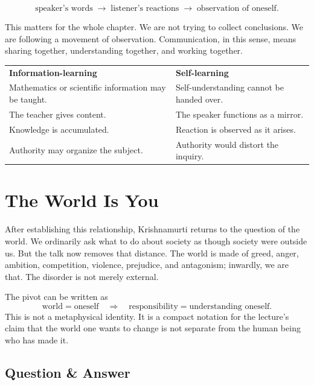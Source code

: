 \begin{equation}
\text{speaker's words}
\;\longrightarrow\;
\text{listener's reactions}
\;\longrightarrow\;
\text{observation of oneself}.
\end{equation}

This matters for the whole chapter. We are not trying to collect conclusions. We are following a movement of observation. Communication, in this sense, means sharing together, understanding together, and working together.

\begin{table}
\centering
\begin{tabular}{p{.42\linewidth}p{.42\linewidth}}
\textbf{Information-learning} & \textbf{Self-learning} \\
Mathematics or scientific information may be taught. & Self-understanding cannot be handed over. \\
The teacher gives content. & The speaker functions as a mirror. \\
Knowledge is accumulated. & Reaction is observed as it arises. \\
Authority may organize the subject. & Authority would distort the inquiry. \\
\end{tabular}
\end{table}

\section{The World Is You}

After establishing this relationship, Krishnamurti returns to the question of the world. We ordinarily ask what to do about society as though society were outside us. But the talk now removes that distance. The world is made of greed, anger, ambition, competition, violence, prejudice, and antagonism; inwardly, we are that. The disorder is not merely external.

The pivot can be written as
\begin{equation}
\text{world} = \text{oneself}
\quad\Longrightarrow\quad
\text{responsibility} = \text{understanding oneself}.
\end{equation}
This is not a metaphysical identity. It is a compact notation for the lecture's claim that the world one wants to change is not separate from the human being who has made it.

\subsection{Question \& Answer}

